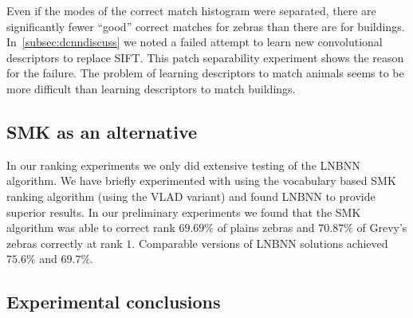         Even if the modes of the correct match histogram were
          separated, there are significantly fewer ``good'' correct
          matches for zebras than there are for buildings.
        In~\cref{subsec:dcnndiscuss} we noted a failed attempt to learn
          new convolutional descriptors to replace SIFT{}.
        This patch separability experiment shows the reason for the
          failure.
        The problem of learning descriptors to match animals seems to
          be more difficult than learning descriptors to match buildings.

        \PzVsLibertyPatches{}

        \PzVsLiberty{}


    \subsection{SMK as an alternative}\label{sub:exptsum}  

        In our ranking experiments we only did extensive testing of the LNBNN algorithm.
        We have briefly experimented with using the vocabulary based SMK ranking algorithm (using the VLAD variant)
          and found LNBNN to provide superior results.
        In our preliminary experiments we found that the SMK algorithm was able to correct rank $69.69\percent$ of
          plains zebras and $70.87\percent$ of Grevy's zebras correctly at rank $1$.
        Comparable versions of LNBNN solutions achieved $75.6\percent$ and $69.7\percent$.

    \subsection{Experimental conclusions}\label{sub:exptsum}  

